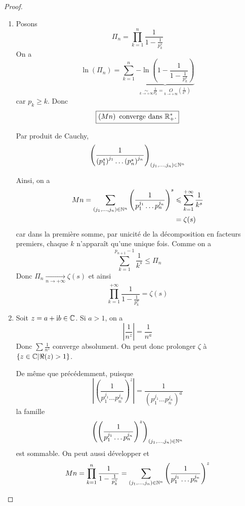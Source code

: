 \documentclass[12pt]{article}
\begin{document}
\begin{proof}
\begin{enumerate}
		\item Posons 
		\begin{equation}\Pi_{n}=\prod_{k=1}^{n}\frac{1}{1-\frac{1}{p_{k}^{s}}}\end{equation}
		On a 
		\begin{equation}\ln\left(\Pi_{n}\right)=\sum_{k=1}^{n}\underbrace{-\ln\left(1-\frac{1}{1-\frac{1}{p_{k}^{s}}}\right)}_{\underset{k\to+\infty}{\sim}\frac{1}{p_{k}^{s}}=\underset{k\to+\infty}{O}\left(\frac{1}{k^{s}}\right)}\end{equation}
		car $p_{k}\geqslant k$. 
		Donc 
		\begin{equation}\boxed{\left(\Pi_{n}\right)\text{ converge dans }\R_{+}^{*}\text{.}}\end{equation}
		
		Par produit de Cauchy,
		\begin{equation}\left(\frac{1}{\left(p_{1}^{s}\right)^{j_{1}}\dots\left(p_{n}^{s}\right)^{j_{n}}}\right)_{(j_{1},\dots,j_{n})\in\mathbb{N}^{n}}\end{equation}
		
		Ainsi, on a 
		\begin{align}
			\Pi_{n}=\sum_{(j_{1},\dots,j_{n})\in\N^{n}}\left(\frac{1}{p_{1}^{j_{1}}\dots p_{n}^{j_{n}}}\right)^{s}
			&\leqslant\sum_{k=1}^{+\infty}\frac{1}{k^{s}}\\
			&=\zeta(s)
		\end{align}
		car dans la première somme, par unicité de la décomposition en facteurs premiers, chaque $k$ n'apparaît qu'une unique fois.
		Comme on a 
		\begin{equation}\sum_{k=1}^{p_{n+1}-1}\frac{1}{k^{s}}\leqslant \Pi_{n}\end{equation}
		Donc $\Pi_{n}\xrightarrow[n\to+\infty]{}\zeta(s)$ et ainsi 
		\begin{equation}\boxed{\prod_{k=1}^{+\infty}\frac{1}{1-\frac{1}{p_{k}^{s}}}=\zeta(s)}\end{equation}

		\item Soit $z=a+\mathrm{i} b\in\mathbb{C}$. Si $a>1$, on a 
		\begin{equation}\left\vert\frac{1}{n^{z}}\right\vert=\frac{1}{n^{a}}\end{equation}
		Donc $\sum \frac{1}{n^{z}}$ converge absolument. On peut donc prolonger $\zeta$ à $\left\{z\in\mathbb{C}\middle|\Re(z)>1\right\}$.

		De même que précédemment, puisque 
		\begin{equation}\left\vert\left(\frac{1}{p_{1}^{j_{1}}\dots p_{n}^{j_{n}}}\right)^{z}\right\vert=\frac{1}{\left(p_{1}^{j_{1}}\dots p_{n}^{j_{n}}\right)^{a}}\end{equation}
		la famille 
		\begin{equation}\left(\left(\frac{1}{p_{1}^{j_{1}}\dots p_{n}^{j_{n}}}\right)^{z}\right)_{(j_{1},\dots,j_{n})\in\mathbb{N}^{n}}\end{equation}
		est sommable. On peut aussi développer et 
		\begin{equation}\Pi_{n}=\prod_{k=1}^{n}\frac{1}{1-\frac{1}{p_{k}^{z}}}=\sum_{(j_{1},\dots,j_{n})\in\N^{n}}\left(\frac{1}{p_{1}^{j_{1}}\dots p_{n}^{j_{n}}}\right)^{z}\end{equation}
		

\end{enumerate}
\end{proof}
\end{document}
